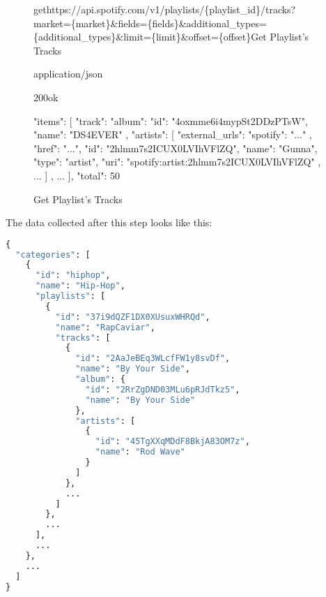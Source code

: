 \begin{figure}[H]
    \caption{Get Playlist's Tracks}
	\label{fig:Get Playlist's Tracks}
\begin{apiRoute}{get}{https://api.spotify.com/v1/playlists/\{playlist\_id\}/tracks?market=\{market\}\&fields=\{fields\}\&additional\_types=\{additional\_types\}\&limit=\{limit\}\&offset=\{offset\}}{Get Playlist's Tracks}
    \begin{routeParameter}
    \end{routeParameter}
    \begin{routeResponse}{application/json}
        \begin{routeResponseItem}{200}{ok}
            \begin{routeResponseItemBody}
{
    "items": [
        {
            "track": {
                "album": {
                    "id": "4oxmme6i4mypSt2DDzPTsW",
                    "name": "DS4EVER"
                },
                "artists": [
                    {
                        "external_urls": {
                            "spotify": "..."
                        },
                        "href": "...",
                        "id": "2hlmm7s2ICUX0LVIhVFlZQ",
                        "name": "Gunna",
                        "type": "artist",
                        "uri": "spotify:artist:2hlmm7s2ICUX0LVIhVFlZQ"
                    },
                    ...
                ]
            }
        },
        ...
    ],
    "total": 50
}
            \end{routeResponseItemBody}
        \end{routeResponseItem}
    \end{routeResponse}
\end{apiRoute}
\end{figure}

The data collected after this step looks like this:

\begin{lstlisting}[language=Python]
{
  "categories": [
    {
      "id": "hiphop",
      "name": "Hip-Hop",
      "playlists": [
        {
          "id": "37i9dQZF1DX0XUsuxWHRQd",
          "name": "RapCaviar",
          "tracks": [
            {
              "id": "2AaJeBEq3WLcfFW1y8svDf",
              "name": "By Your Side",
              "album": {
                "id": "2RrZgDND03MLu6pRJdTkz5",
                "name": "By Your Side"
              },
              "artists": [
                {
                  "id": "45TgXXqMDdF8BkjA83OM7z",
                  "name": "Rod Wave"
                }
              ]
            },
            ... 
          ]
        },
        ...
      ],
      ...
    },
    ...
  ]
}
\end{lstlisting}

